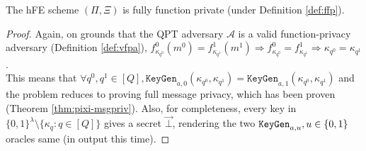 \begin{corollary}
\label{cor:pixi-funcpriv}
The hFE scheme $(\Pi,\Xi)$ is fully function private (under Definition \ref{def:ffp}).
\end{corollary}
\begin{proof}
Again, on grounds that the QPT adversary $\mathcal{A}$ is a valid function-privacy adversary (Definition \ref{def:vfpa}), 
$f^0_{\kappa_{q^0}}(m^0) = f^1_{\kappa_{q^1}}(m^1) \Rightarrow f^0_{\kappa_{q^0}} = f^1_{\kappa_{q^1}} \Rightarrow \kappa_{q^0} = \kappa_{q^1}$. \\
This means that $\forall q^0,q^1 \in [Q],  \texttt{KeyGen}_{a,0}(\kappa_{q^0},\kappa_{q^1}) = \texttt{KeyGen}_{a,1}(\kappa_{q^0},\kappa_{q^1})$ and the problem reduces to proving full message privacy, which has been proven (Theorem \ref{thm:pixi-msgpriv}). Also, for completeness, every key in $\{ 0,1 \}^\lambda \setminus \{ \kappa_q: q \in [Q] \}$ gives a secret $\vec \bot$, rendering the two $\texttt{KeyGen}_{a,u}, u \in \{ 0,1 \}$ oracles same (in output this time). 
\end{proof}

